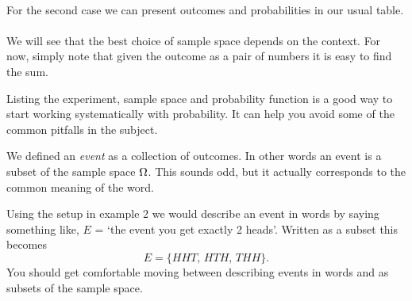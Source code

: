
{}\\

For the second case we can present outcomes and probabilities in our usual table.\\

\\

We will see that the best choice of sample space depends on the context. For now, simply
note that given the outcome as a pair of numbers it is easy to
find the sum.


 Listing the experiment, sample space and probability function
is a good way to start working systematically with probability. It can help 
you avoid some of the common pitfalls in the subject.

\medskip


We defined an  \emph{event} as a collection of outcomes. In other words
an event is a subset of the sample space $\Omega$. This sounds
odd, but it actually corresponds to the common meaning of the word.

\numexamp Using the setup in example 2 we would describe an
event in words by saying something like, $E$ = `the event
you get exactly 2 heads'. Written as a subset this becomes
\[E = \{HHT, \, HTH, \, THH\}.\]
You should get comfortable moving between describing events
in words and as subsets of the sample space.

